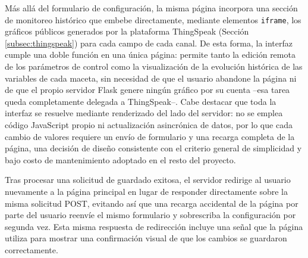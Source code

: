 Más allá del formulario de configuración, la misma página incorpora una sección de monitoreo histórico que embebe directamente, mediante elementos \texttt{iframe}, los gráficos públicos generados por la plataforma ThingSpeak (Sección \ref{subsec:thingspeak}) para cada campo de cada canal. De esta forma, la interfaz cumple una doble función en una única página: permite tanto la edición remota de los parámetros de control como la visualización de la evolución histórica de las variables de cada maceta, sin necesidad de que el usuario abandone la página ni de que el propio servidor Flask genere ningún gráfico por su cuenta --esa tarea queda completamente delegada a ThingSpeak--. Cabe destacar que toda la interfaz se resuelve mediante renderizado del lado del servidor: no se emplea código JavaScript propio ni actualización asincrónica de datos, por lo que cada cambio de valores requiere un envío de formulario y una recarga completa de la página, una decisión de diseño consistente con el criterio general de simplicidad y bajo costo de mantenimiento adoptado en el resto del proyecto.

Tras procesar una solicitud de guardado exitosa, el servidor redirige al usuario nuevamente a la página principal en lugar de responder directamente sobre la misma solicitud POST, evitando así que una recarga accidental de la página por parte del usuario reenvíe el mismo formulario y sobrescriba la configuración por segunda vez. Esta misma respuesta de redirección incluye una señal que la página utiliza para mostrar una confirmación visual de que los cambios se guardaron correctamente.

